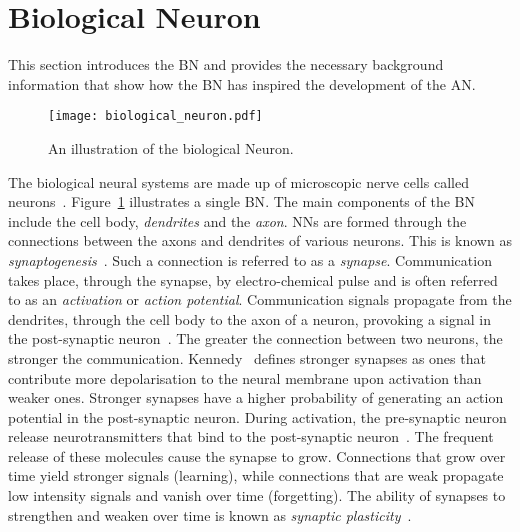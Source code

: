 \section{Biological Neuron}\label{sec:anns:bn}

This section introduces the \acs{BN} and provides the necessary background information that show how the \acs{BN} has inspired the development of the \acs{AN}.

\begin{figure}[htb]
      \centering
      \texttt{[image: biological\_neuron.pdf]}
      \caption[The biological Neuron]{An illustration of the biological Neuron.}
      \label{fig:biological_neuron}
\end{figure}

The biological neural systems are made up of microscopic nerve cells called neurons~\cite{ref:jain:1996}. Figure~\ref{fig:biological_neuron} illustrates a single \acs{BN}. The main components of the \acs{BN} include the cell body, \textit{dendrites} and the \textit{axon}. \Acp{NN} are formed through the connections between the axons and dendrites of various neurons. This is known as \textit{synaptogenesis}~\cite{ref:huttenlocher:1997}. Such a connection is referred to as a \textit{synapse}. Communication takes place, through the synapse, by electro-chemical pulse and is often referred to as an \textit{activation} or \textit{action potential}.  Communication signals propagate from the dendrites, through the cell body to the axon of a neuron, provoking a signal in the post-synaptic neuron~\cite{ref:engelbrecht:2007}. The greater the connection between two neurons, the stronger the communication.  Kennedy~\cite{ref:kennedy:2016} defines stronger synapses as ones that contribute more depolarisation to the neural membrane upon activation than weaker ones. Stronger synapses have a higher probability of generating an action potential in the post-synaptic neuron. During activation, the pre-synaptic neuron release neurotransmitters that bind to the post-synaptic neuron~\cite{ref:khanacademy:synapse}. The frequent release of these molecules cause the synapse to grow. Connections that grow over time yield stronger signals (learning), while connections that are weak propagate low intensity signals and vanish over time (forgetting). The ability of synapses to strengthen and weaken over time is known as \textit{synaptic plasticity}~\cite{ref:huttenlocher:1997}.

